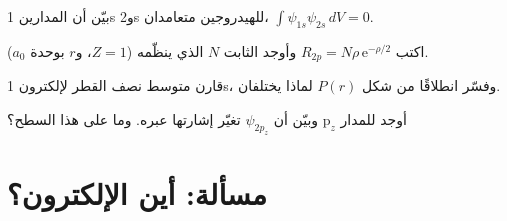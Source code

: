 \begin{exercise}[$\star\star$]\label{exo:b2:atomic-orbitals:9}
بيّن أن المدارين 1s و2s للهيدروجين متعامدان،
$\int\psi_{1s}\psi_{2s}\,dV = 0$.
\end{exercise}

\begin{exercise}[$\star\star\star$]\label{exo:b2:atomic-orbitals:10}
اكتب $R_{2p} = N\rho\,\mathrm e^{-\rho/2}$ وأوجد الثابت $N$ الذي ينظّمه
($Z = 1$، و$r$ بوحدة $a_0$).
\end{exercise}

\begin{exercise}[$\star\star\star$]\label{exo:b2:atomic-orbitals:11}
قارن متوسط نصف القطر  لإلكترون 1s، 
وفسّر انطلاقًا من شكل $P(r)$ لماذا يختلفان.
\end{exercise}

\begin{exercise}[$\star\star\star$]\label{exo:b2:atomic-orbitals:12}
أوجد  للمدار $\mathrm p_z$ وبيّن أن $\psi_{2p_z}$
تغيّر إشارتها عبره. وما  على هذا السطح؟
\end{exercise}

\section{مسألة: أين الإلكترون؟}

